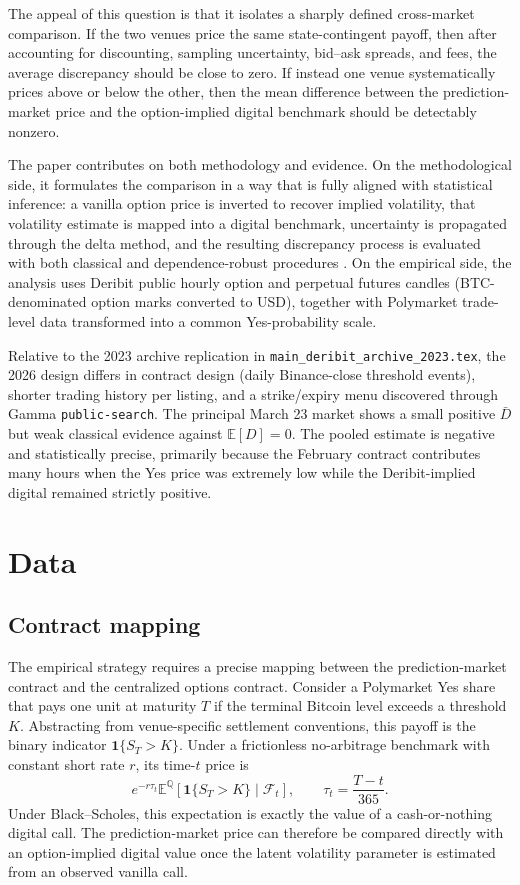 \documentclass[11pt]{article}
\numberwithin{equation}{section}
\theoremstyle{plain}
\begin{document}
The appeal of this question is that it isolates a sharply defined cross-market comparison. If the two venues price the same state-contingent payoff, then after accounting for discounting, sampling uncertainty, bid--ask spreads, and fees, the average discrepancy should be close to zero. If instead one venue systematically prices above or below the other, then the mean difference between the prediction-market price and the option-implied digital benchmark should be detectably nonzero.

The paper contributes on both methodology and evidence. On the methodological side, it formulates the comparison in a way that is fully aligned with statistical inference: a vanilla option price is inverted to recover implied volatility, that volatility estimate is mapped into a digital benchmark, uncertainty is propagated through the delta method, and the resulting discrepancy process is evaluated with both classical and dependence-robust procedures \citep{casella2002,newey1987}. On the empirical side, the analysis uses Deribit public hourly option and perpetual futures candles (BTC-denominated option marks converted to USD), together with Polymarket trade-level data transformed into a common Yes-probability scale.

Relative to the 2023 archive replication in \texttt{main\_deribit\_archive\_2023.tex}, the 2026 design differs in contract design (daily Binance-close threshold events), shorter trading history per listing, and a strike/expiry menu discovered through Gamma \texttt{public-search}. The principal March 23 market shows a small positive $\bar{D}$ but weak classical evidence against $\mathbb{E}[D]=0$. The pooled estimate is negative and statistically precise, primarily because the February contract contributes many hours when the Yes price was extremely low while the Deribit-implied digital remained strictly positive.

\section{Data}
\subsection{Contract mapping}
The empirical strategy requires a precise mapping between the prediction-market contract and the centralized options contract. Consider a Polymarket Yes share that pays one unit at maturity $T$ if the terminal Bitcoin level exceeds a threshold $K$. Abstracting from venue-specific settlement conventions, this payoff is the binary indicator $\mathbf{1}\{S_T > K\}$. Under a frictionless no-arbitrage benchmark with constant short rate $r$, its time-$t$ price is
\[
e^{-r\tau_t}\mathbb{E}^{\mathbb{Q}}\!\left[\mathbf{1}\{S_T > K\}\mid\mathcal{F}_t\right],
\qquad
\tau_t = \frac{T-t}{365}.
\]
Under Black--Scholes, this expectation is exactly the value of a cash-or-nothing digital call. The prediction-market price can therefore be compared directly with an option-implied digital value once the latent volatility parameter is estimated from an observed vanilla call.
\end{document}

